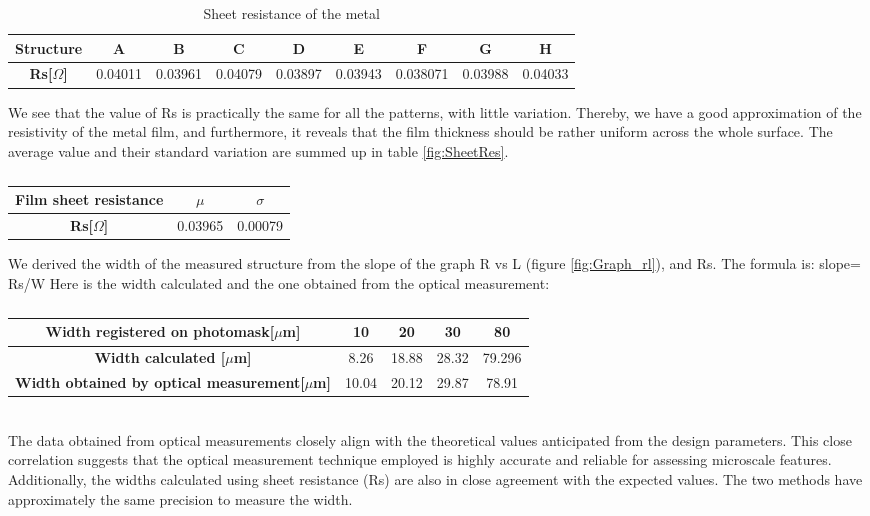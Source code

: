 \documentclass[a4paper, table]{article}
\begin{document}
\begin{table}[h!]
    \centering
    \caption{Sheet resistance of the metal}
    \begin{tabular}{|c|c|c|c|c|c|c|c|c|}
        \hline
        \textbf{Structure} & \textbf{A} & \textbf{B} & \textbf{C} & \textbf{D} & \textbf{E} & \textbf{F} & \textbf{G} & \textbf{H} \\ \hline
        \textbf{Rs[$\Omega$]} & 0.04011 & 0.03961 & 0.04079 & 0.03897 & 0.03943 & 0.038071 & 0.03988 & 0.04033 \\ \hline
    \end{tabular}
\end{table}
We see that the value of Rs is practically the same for all the patterns, with little variation. Thereby, we have a good approximation of the resistivity of the metal film, and furthermore, it reveals that the film thickness should be rather uniform across the whole surface.
The average value and their standard variation are summed up in table \ref{fig:SheetRes}.

\begin{table}[h!]
    \centering
    \caption{}
    \label{fig:SheetRes}
    \begin{tabular}{|c|c|c|}
        \hline
        \textbf{Film sheet resistance} & \textbf{$\mu$} & \textbf{$\sigma$} \\ \hline
        \textbf{Rs[$\Omega$]} & 0.03965 & 0.00079 \\ \hline
    \end{tabular}
    \label{mean1}
\end{table}
\pagebreak
We derived the width of the measured structure from the slope of the graph R vs L (figure \ref{fig:Graph_rl}), and Rs. The formula is: slope= Rs/W
Here is the width calculated and the one obtained from the optical measurement: \\
\begin{table}[h!]
    \centering
    \caption{}
    \begin{tabular}{|c|c|c|c|c|}
        \hline
        \textbf{Width registered on photomask[$\mu$m]} & \textbf{10} & \textbf{20} & \textbf{30} & \textbf{80}\\ \hline
        \textbf{Width calculated [$\mu$m]} & 8.26 & 18.88 & 28.32 & 79.296 \\ \hline
        \textbf{Width obtained by optical measurement[$\mu$m]} & 10.04 & 20.12 & 29.87 & 78.91\\ \hline
    \end{tabular}
    \label{mean2}
\end{table} 
\\
The data obtained from optical measurements closely align with the theoretical values anticipated from the design parameters. This close correlation suggests that the optical measurement technique employed is highly accurate and reliable for assessing microscale features. Additionally, the widths calculated using sheet resistance (Rs) are also in close agreement with the expected values. The two methods have approximately the same precision to measure the width.
\end{document}
